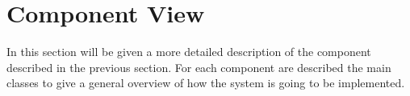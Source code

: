 \documentclass[../../../../dd.tex]{subfiles}
\begin{document}
	\section{Component View}

		In this section will be given a more detailed description of the component described in the previous section. For each component are described the main classes to give a general overview of how the system is going to be implemented.
	
	
	
	
	
	
		
\end{document}
